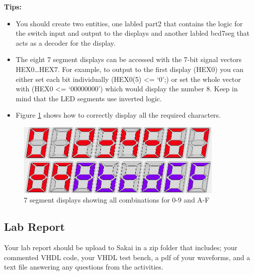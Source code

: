 {\bf Tips:} 
\begin{itemize}
	\item You should create two entities, one labled part2 that contains the logic for the switch input and output to the displays and another labled bcd7seg that acts as a decoder for the display.
	
	\item The eight 7 segment displays can be accessed with the 7-bit signal vectors HEX0\ldots HEX7. For example, to output to the first display (HEX0) you can either set each bit individually (HEX0(5) <= `0';) or set the whole vector with (HEX0 <= `00000000') which would display the number 8. Keep in mind that the LED segments use inverted logic.
	  
	\item Figure \ref{fig:7segreference} shows how to correctly display all the required characters.
\end{itemize}

\begin{figure}[H]
	\centering
	\includegraphics[width=100mm]{Lab1/figures/7segreference.png}
	\caption{7 segment displays showing all combinations for 0-9 and A-F}
	\label{fig:7segreference}
\end{figure}

\subsection{Lab Report}

Your lab report should be upload to Sakai in a zip folder that includes; your commented VHDL code, your VHDL test bench, a pdf of your waveforms, and a text file answering any questions from the activities.


